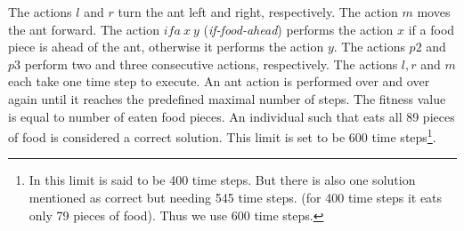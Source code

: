 \documentclass[conference]{IEEEtran}
\begin{document}
The actions $l$ and $r$ turn the ant left and right, respectively. 
The action $m$ moves the ant forward.
The action $ifa~x~y$ \mbox{(\textit{if-food-ahead})} 
performs the action $x$ if a food piece is ahead of the ant,
otherwise it performs the action $y$.
The actions $p2$ and $p3$ perform two and three consecutive actions, respectively.
The actions $l, r$ and $m$ each take one time step to execute.
An ant action is performed over and over again until it reaches the predefined
maximal number of steps. 
The fitness value is equal to number of eaten food pieces.
An individual such that eats all 89 pieces of food is 
considered a correct solution.
This limit is set to be 600 time steps\footnote{
In \cite{koza92} this limit is said to be 400 time steps.
But there is also one solution mentioned as correct but needing 545 time steps. (for 400 time steps it eats only 79 pieces of food). 
Thus we use 600 time steps. 
}.
\end{document}

